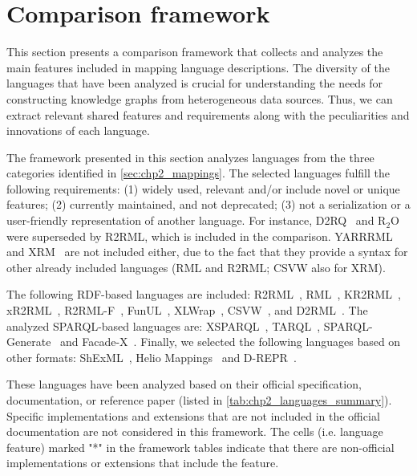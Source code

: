 \section{Comparison framework}
\label{sec:chp4_framework}


This section presents a comparison framework that collects and analyzes the main features included in mapping language descriptions. The diversity of the languages that have been analyzed is crucial for understanding the needs for constructing knowledge graphs from heterogeneous data sources. Thus, we can extract relevant shared features and requirements along with the peculiarities and innovations of each language. 

The framework presented in this section analyzes languages from the three categories identified in \cref{sec:chp2_mappings}. The selected languages fulfill the following requirements: (1) widely used, relevant and/or include novel or unique features; (2) currently maintained, and not deprecated; (3) not a serialization or a user-friendly representation of another language. For instance, D2RQ~\parencite{bizer2004d2rq} and R$_2$O~\parencite{barrasa2004r2o} were superseded by R2RML, which is included in the comparison. YARRRML~\parencite{Heyvaert2018yarrrml} and XRM~\parencite{xrm} are not included either, due to the fact that they provide a syntax for other already included languages (RML and R2RML; CSVW also for XRM).


The following RDF-based languages are included: R2RML~\parencite{das2012r2rml}, RML~\parencite{Dimou2014rml}, KR2RML~\parencite{slepicka2015kr2rml}, xR2RML~\parencite{michel2015xr2rml}, R2RML-F~\parencite{debruyne2016r2rmlf}, FunUL~\parencite{junior2016funul},  XLWrap~\parencite{langegger2009xlwrap}, CSVW~\parencite{Tennison2015csvw}, and D2\-RML~\parencite{chortaras2018d2rml}. The analyzed SPARQL-based languages are: XSPARQL~\parencite{Bischof2012xsparql}, TARQL~\parencite{tarql},  SPARQL-Gene\-rate~\parencite{Lefrancois2017sparqlgenerate} and Facade-X~\parencite{daga2021facade}. Finally, we selected the following languages based on other formats: ShExML~\parencite{Garcia-Gonzalez2020shexml}, Helio Mappings~\parencite{cimmino2022helio} and D-REPR~\parencite{Vu2019d-repr}.  

These languages have been analyzed based on their official specification, documentation, or reference paper (listed in \cref{tab:chp2_languages_summary}). Specific implementations and extensions that are not included in the official documentation are not considered in this framework. The cells (i.e. language feature) marked "*"  in the framework tables indicate that there are non-official implementations or extensions that include the feature.

